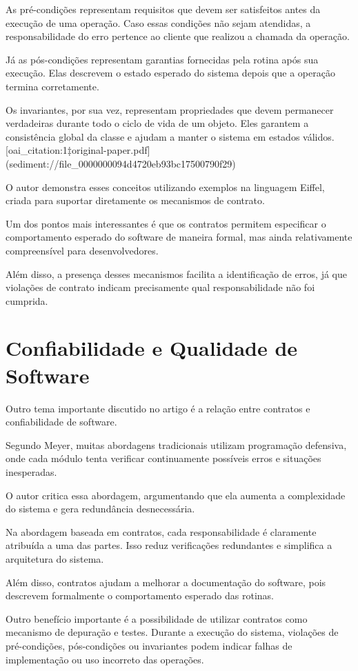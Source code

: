 \documentclass[conference]{IEEEtran}
\begin{document}
As pré-condições representam requisitos que devem ser satisfeitos antes da execução de uma operação. Caso essas condições não sejam atendidas, a responsabilidade do erro pertence ao cliente que realizou a chamada da operação.

Já as pós-condições representam garantias fornecidas pela rotina após sua execução. Elas descrevem o estado esperado do sistema depois que a operação termina corretamente.

Os invariantes, por sua vez, representam propriedades que devem permanecer verdadeiras durante todo o ciclo de vida de um objeto. Eles garantem a consistência global da classe e ajudam a manter o sistema em estados válidos.  [oai_citation:1‡original-paper.pdf](sediment://file_0000000094d4720eb93bc17500790f29)

O autor demonstra esses conceitos utilizando exemplos na linguagem Eiffel, criada para suportar diretamente os mecanismos de contrato.

Um dos pontos mais interessantes é que os contratos permitem especificar o comportamento esperado do software de maneira formal, mas ainda relativamente compreensível para desenvolvedores.

Além disso, a presença desses mecanismos facilita a identificação de erros, já que violações de contrato indicam precisamente qual responsabilidade não foi cumprida.

\section{Confiabilidade e Qualidade de Software}

Outro tema importante discutido no artigo é a relação entre contratos e confiabilidade de software.

Segundo Meyer, muitas abordagens tradicionais utilizam programação defensiva, onde cada módulo tenta verificar continuamente possíveis erros e situações inesperadas.

O autor critica essa abordagem, argumentando que ela aumenta a complexidade do sistema e gera redundância desnecessária.

Na abordagem baseada em contratos, cada responsabilidade é claramente atribuída a uma das partes. Isso reduz verificações redundantes e simplifica a arquitetura do sistema.

Além disso, contratos ajudam a melhorar a documentação do software, pois descrevem formalmente o comportamento esperado das rotinas.

Outro benefício importante é a possibilidade de utilizar contratos como mecanismo de depuração e testes. Durante a execução do sistema, violações de pré-condições, pós-condições ou invariantes podem indicar falhas de implementação ou uso incorreto das operações.
\end{document}
